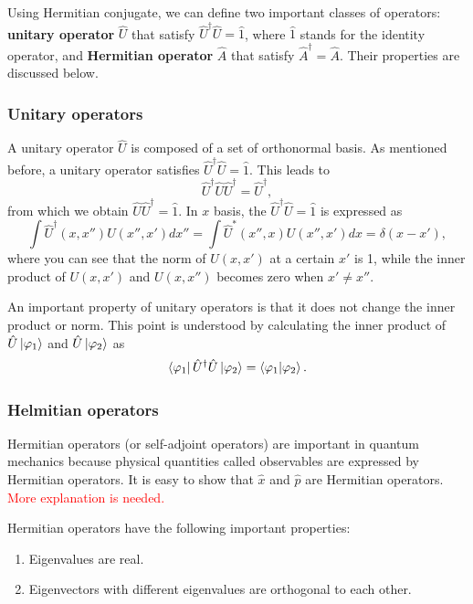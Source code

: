 Using Hermitian conjugate, we can define two important classes of operators: \textbf{unitary operator} $\hat U$ that satisfy $\hat U^\dagger \hat U = \hat 1$, where $\hat 1$ stands for the identity operator, and \textbf{Hermitian operator} $\hat A$ that satisfy $\hat A^\dagger = \hat A$. Their properties are discussed below.

\subsubsection{Unitary operators}
A unitary operator $\hat U$ is composed of a set of orthonormal basis. As mentioned before, a unitary operator satisfies $\hat U^\dagger\hat U = \hat 1$. This leads to 
\begin{equation}
  \hat U^\dagger\hat U \hat U^\dagger = \hat U^\dagger,
\end{equation}
from which we obtain $\hat U \hat U^\dagger = \hat 1$. In $x$ basis, the $\hat U^\dagger \hat U = \hat 1$ is expressed as
\begin{equation}
  \int \hat U^\dagger(x,x'') U(x'',x')dx'' = \int \hat U^*(x'',x) U(x'',x')dx = \delta(x - x'),
\end{equation}
where you can see that the norm of $U(x, x')$ at a certain $x'$ is 1, while the inner product of $U(x, x')$ and $U(x, x'')$ becomes zero when $x' \neq x''$.

An important property of unitary operators is that it does not change the inner product or norm. This point is understood by calculating the inner product of $\hat U\ket{\varphi_1}$ and $\hat U\ket{\varphi_2}$ as
\begin{equation}
  \bra{\varphi_1}\hat U^\dagger\hat U\ket{\varphi_2} = \braket{\varphi_1|\varphi_2}.
\end{equation}


\subsubsection{Helmitian operators}
Hermitian operators (or self-adjoint operators) are important in quantum mechanics because physical quantities called observables are expressed by Hermitian operators. It is easy to show that $\hat x$ and $\hat p$ are Hermitian operators. \textcolor{red}{More explanation is needed.}

Hermitian operators have the following important properties: 
\begin{enumerate}
	\item Eigenvalues are real.
	\item Eigenvectors with different eigenvalues are orthogonal to each other. 
\end{enumerate}

